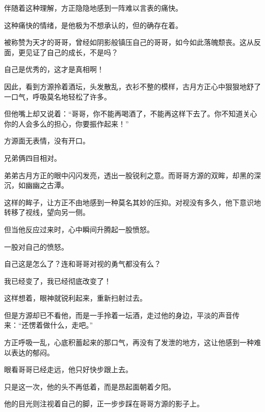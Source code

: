 \begin{this_body}
伴随着这种理解，方正隐隐地感到一阵难以言表的痛快。

这种痛快的情绪，是他极为不想承认的，但的确存在着。

被称赞为天才的哥哥，曾经如阴影般镇压自己的哥哥，如今如此落魄颓丧。这从反面，更见证了自己的成长，不是吗？

自己是优秀的，这才是真相啊！

因此，看到方源拎着酒坛，头发散乱，衣衫不整的模样，古月方正心中狠狠地舒了一口气，呼吸莫名地轻松了许多。

但他嘴上却又说着：“哥哥，你不能再喝酒了，不能再这样下去了。你不知道关心你的人会多么的担心，你要振作起来！”

方源面无表情，没有开口。

兄弟俩四目相对。

弟弟古月方正的眼中闪闪发亮，透出一股锐利之意。而哥哥方源的双眸，却黑的深沉，如幽幽之古潭。

这样的眸子，让方正不由地感到一种莫名其妙的压抑。对视没有多久，他下意识地转移了视线，望向另一侧。

但当他反应过来时，心中瞬间升腾起一股愤怒。

一股对自己的愤怒。

自己这是怎么了？连和哥哥对视的勇气都没有么？

我已经变了，我已经彻底改变了！

这样想着，眼神就锐利起来，重新扫射过去。

但是方源却已不看他，而是一手拎着一坛酒，走过他的身边，平淡的声音传来：“还愣着做什么，走吧。”

方正呼吸一乱，心底积蓄起来的那口气，再没有了发泄的地方，这让他感到一种难以表达的郁闷。

眼看哥哥已经走远，他只好快步跟上去。

只是这一次，他的头不再低着，而是昂起面朝着夕阳。

他的目光则注视着自己的脚，正一步步踩在哥哥方源的影子上。

\end{this_body}

